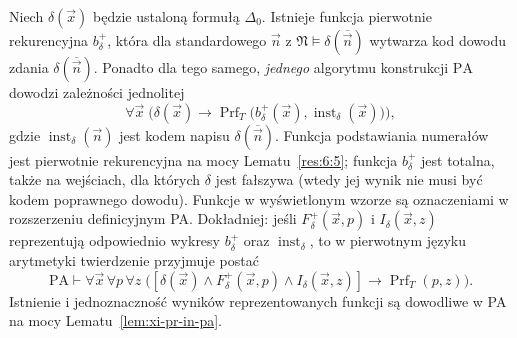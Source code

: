 \begin{lemat}
\label{lem:xi-delta-proofcompiler}
Niech $\delta(\vec x)$ będzie ustaloną formułą $\Delta_0$.
Istnieje funkcja pierwotnie rekurencyjna $b_\delta^+$,
która dla standardowego $\vec n$ z
$\mathfrak N\models\delta(\overline{\vec n})$
wytwarza kod dowodu zdania $\delta(\overline{\vec n})$.
Ponadto dla tego samego, \emph{jednego} algorytmu
konstrukcji $\mathrm{PA}$ dowodzi zależności jednolitej
\[
\forall\vec x\;\bigl(\delta(\vec x)\to
\operatorname{Prf}_T\bigl(b_\delta^+(\vec x),
\operatorname{inst}_\delta(\vec x)\bigr)\bigr),
\]
gdzie $\operatorname{inst}_\delta(\vec n)$ jest kodem
napisu $\delta(\overline{\vec n})$. Funkcja podstawiania
numerałów jest pierwotnie rekurencyjna na mocy
Lematu~\ref{res:6:5}; funkcja $b_\delta^+$ jest totalna,
także na wejściach, dla których $\delta$ jest fałszywa
(wtedy jej wynik nie musi być kodem poprawnego dowodu).
Funkcje w wyświetlonym wzorze są oznaczeniami
w rozszerzeniu definicyjnym PA. Dokładniej: jeśli
$F_\delta^+(\vec x,p)$ i $I_\delta(\vec x,z)$
reprezentują odpowiednio wykresy $b_\delta^+$ oraz
$\operatorname{inst}_\delta$, to w pierwotnym języku
arytmetyki twierdzenie przyjmuje postać
\[
\mathrm{PA}\vdash\forall\vec x\,\forall p\,\forall z\;\bigl(
[\delta(\vec x)\land F_\delta^+(\vec x,p)\land
 I_\delta(\vec x,z)]\to\operatorname{Prf}_T(p,z)\bigr).
\]
Istnienie i jednoznaczność wyników reprezentowanych funkcji
są dowodliwe w PA na mocy Lematu~\ref{lem:xi-pr-in-pa}.
\end{lemat}
